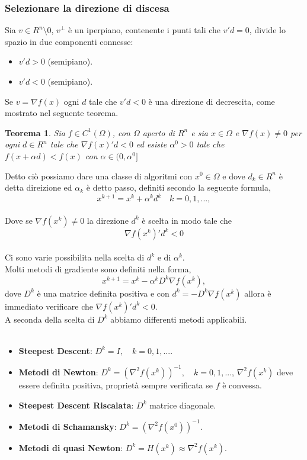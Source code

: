 \documentclass[a4paper, 12pt]{article}
\newtheorem{theorem}{Teorema}
\begin{document}
\subsubsection{Selezionare la direzione di discesa}
Sia $v \in R^n \setminus 0$, $v^\perp$ è un iperpiano, contenente i punti tali che $v'd = 0$, divide lo spazio in due componenti connesse:
\begin{itemize}
  \item $v'd > 0$ (semipiano).
  \item $v'd < 0$ (semipiano).
\end{itemize}
Se $v = \nabla f(x)$ ogni $d$ tale che $v'd < 0$ è una direzione di decrescita, come mostrato nel seguente teorema.
\begin{theorem}
Sia $f \in C^1(\Omega)$, con $\Omega$ aperto di $R^n$ e sia $x \in \Omega$ e $\nabla f(x) \neq 0$ per ogni $d \in R^n$ tale che $\nabla f(x)'d < 0$ ed esiste $\alpha^0 > 0$ tale che $f(x + \alpha d) < f(x)$ con $\alpha \in (0, \alpha^0]$
\end{theorem}
Detto ciò possiamo dare una classe di algoritmi con $x^0 \in \Omega$ e dove $d_k \in R^n$ è detta direizione ed $\alpha_k$ è detto passo, definiti secondo la seguente formula,\\
\[x^{k+1} = x^k + \alpha^k d^k \quad k=0, 1, ... ,\]\\
Dove se $\nabla f(x^k) \neq 0$ la direzione $d^k$ è scelta in modo tale che\\
\[\nabla f(x^k)'d^k < 0\]\\
Ci sono varie possibilita nella scelta di $d^k$ e di $\alpha^k$.\\
Molti metodi di gradiente sono definiti nella forma,
\[x^{k+1} = x^k - \alpha^k D^k \nabla f(x^k),\]
dove $D^k$ è una matrice definita positiva e con $d^k = -D^k\nabla f(x^k)$ allora è immediato verificare che $\nabla f(x^k)'d^k < 0$.\\
A seconda della scelta di $D^k$ abbiamo differenti metodi applicabili.\\\\
\begin{itemize}
    \item \textbf{Steepest Descent}: $D^k = I, \quad k = 0, 1, ...$.
    \item \textbf{Metodi di Newton}: $D^k = (\nabla^2 f(x^k))^{-1}, \quad k = 0, 1, ...$, $\nabla^2 f(x^k)$ deve essere definita positiva, proprietà sempre verificata se $f$ è convessa.
    \item \textbf{Steepest Descent Riscalata}: $D^k$ matrice diagonale.
    \item \textbf{Metodi di Schamansky}: $D^k = (\nabla^2 f(x^0))^{-1}$.
    \item \textbf{Metodi di quasi Newton}: $D^k = H(x^k) \approx \nabla^2 f(x^k)$.
\end{itemize}
\end{document}
